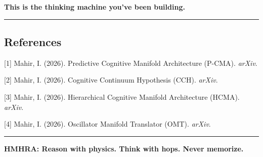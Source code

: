 \documentclass[
  11pt,
  a4paper,
]{article}
\begin{document}
\textbf{This is the thinking machine you've been building.}

\begin{center}\rule{0.5\linewidth}{0.5pt}\end{center}

\subsection{References}\label{references}

{[}1{]} Mahir, I. (2026). Predictive Cognitive Manifold Architecture
(P-CMA). \emph{arXiv}.

{[}2{]} Mahir, I. (2026). Cognitive Continuum Hypothesis (CCH).
\emph{arXiv}.

{[}3{]} Mahir, I. (2026). Hierarchical Cognitive Manifold Architecture
(HCMA). \emph{arXiv}.

{[}4{]} Mahir, I. (2026). Oscillator Manifold Translator (OMT).
\emph{arXiv}.

\begin{center}\rule{0.5\linewidth}{0.5pt}\end{center}

\textbf{HMHRA: Reason with physics. Think with hops. Never memorize.}
\end{document}
